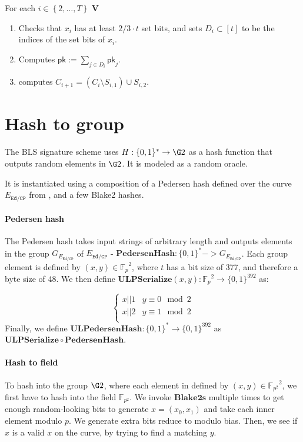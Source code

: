 \documentclass[11pt]{article}
\numberwithin{figure}{section} %
\newcommand{\set}[1]{\ensuremath{\left\{#1\right\}}\xspace}
\newcommand{\Fp}{\ensuremath{\mathbb{F}_p}\xspace}
\newcommand{\Fptwo}{\ensuremath{\mathbb{F}_{p^2}}\xspace}
\newcommand{\defeq}{:=}
\newcommand{\msg}{\ensuremath{\mathsf{m}}\xspace}
\newcommand{\pk}{\ensuremath{\mathsf{pk}}\xspace}
\newcommand{\phash}{\ensuremath{\mathbf{PedersenHash}}\xspace}
\newcommand{\ulphash}{\ensuremath{\mathbf{ULPedersenHash}}\xspace}
\newcommand{\bhash}{\ensuremath{\mathbf{Blake2s}}\xspace}
\newcommand{\ulpserialize}{\ensuremath{\mathbf{ULPSerialize}}\xspace}
\newcommand{\ver}{\ensuremath{\mathsf{\mathbf{V}}}\xspace}
\newcommand{\sig}{\ensuremath{\sigma}\xspace}
\newcommand{\edcp}{\ensuremath{{E}_\mathtt{Ed/CP}}\xspace}
\newcommand{\gedcp}{\ensuremath{G_{{E}_\mathtt{Ed/CP}}}\xspace}
\begin{document}
For each $i\in \set{2,\ldots,T}$ \ver 
\begin{enumerate}
 \item Checks that $x_i$ has at least $2/3\cdot t$ set bits, and sets $D_i\subset [t]$ to be the indices of the set bits of $x_i$.
 \item Computes $\pk\defeq \sum_{j\in D_i} \pk_j$.
 \item computes $C_{i+1} = (C_{i}\setminus S_{i,1})\cup S_{i,2}$.
 
\end{enumerate}

\section{Hash to group}

The BLS signature scheme uses $H: \{0,1\}^* \rightarrow \G2$ as a hash function that outputs random elements in $\G2$. It is modeled as a random oracle.

It is instantiated using a composition of a Pedersen hash defined over the curve $\edcp$ from \cite{bowe2018zexe}, and a few Blake2 hashes. 

\paragraph{Pedersen hash}
The Pedersen hash takes input strings of arbitrary length and outputs elements in the group $\gedcp$ of $\edcp$ - $\phash: \{0,1\}^* -> \gedcp$. Each group element is defined by $(x,y) \in \Fp^2$, where $t$ has a bit size of 377, and therefore a byte size of 48. We then define $\ulpserialize(x,y): \Fp^2 \rightarrow \{0,1\}^{392}$ as:

\[ \begin{cases} 
x || 1 & y \equiv 0 \mod 2 \\
x || 2 & y \equiv 1 \mod 2 \\
\end{cases}
\]
Finally, we define $\ulphash: \{0,1\}^* \rightarrow \{0,1\}^{392}$ as $\ulpserialize \circ \phash $.

\paragraph{Hash to field}
To hash into the group $\G2$, where each element in defined by $(x,y) \in \Fptwo^2$, we first have to hash into the field $\Fptwo$. We invoke $\bhash$ multiple times to get enough random-looking bits to generate $x = (x_0, x_1)$ and take each inner element modulo $p$. We generate extra bits reduce to modulo bias. Then, we see if $x$ is a valid $x$ on the curve, by trying to find a matching $y$.
\end{document}
